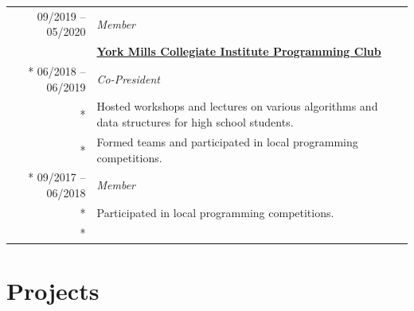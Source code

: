 \documentclass{article}
\begin{document}
{\begin{tabularx}{\textwidth}{r X}
			09/2019 -- 05/2020 & \textit{Member} \\
			\addlinespace
			& \textbf{\href{https://schoolweb.tdsb.on.ca/yorkmillsci/Departments/Computer-Science/Clubs}{York Mills Collegiate Institute Programming Club}} \\*
			06/2018 -- 06/2019 & \textit{Co-President} \\*
			& {\small Hosted workshops and lectures on various algorithms and data structures for high school students.} \\*
			& {\small Formed teams and participated in local programming competitions.} \\*
			09/2017 -- 06/2018 & \textit{Member} \\*
			& {\small Participated in local programming competitions.} \\*
		\end{tabularx}
	}{}

	\section*{Projects}
\end{document}
